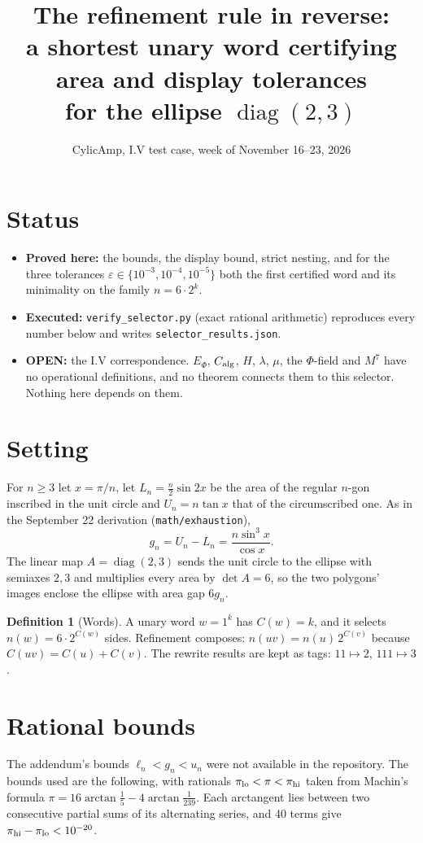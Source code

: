 \documentclass[11pt]{article}
\title{The refinement rule in reverse:\\ a shortest unary word certifying area and display tolerances\\ for the ellipse $\operatorname{diag}(2,3)$}
\author{CylicAmp, I.V test case, week of November 16--23, 2026}
\date{}
\theoremstyle{definition}
\newtheorem{definition}{Definition}
\theoremstyle{remark}
\begin{document}
\maketitle

\section*{Status}
\begin{itemize}
\item \textbf{Proved here:} the bounds, the display bound, strict nesting, and for the three tolerances
$\varepsilon\in\{10^{-3},10^{-4},10^{-5}\}$ both the first certified word and its minimality on the family
$n=6\cdot2^k$.
\item \textbf{Executed:} \texttt{verify\_selector.py} (exact rational arithmetic) reproduces every number below and writes
\texttt{selector\_results.json}.
\item \textbf{OPEN:} the I.V correspondence. $E_\Phi$, $C_{\rm alg}$, $H$, $\lambda$, $\mu$, the $\Phi$-field and $M^7$
have no operational definitions, and no theorem connects them to this selector. Nothing here depends on them.
\end{itemize}

\section{Setting}
For $n\ge 3$ let $x=\pi/n$, let $L_n=\tfrac n2\sin 2x$ be the area of the regular $n$-gon inscribed in the unit circle
and $U_n=n\tan x$ that of the circumscribed one. As in the September 22 derivation (\texttt{math/exhaustion}),
\[
g_n=U_n-L_n=\frac{n\sin^3x}{\cos x}.
\]
The linear map $A=\operatorname{diag}(2,3)$ sends the unit circle to the ellipse with semiaxes $2,3$ and multiplies every
area by $\det A=6$, so the two polygons' images enclose the ellipse with area gap $6g_n$.

\begin{definition}[Words]
A unary word $w=1^k$ has $C(w)=k$, and it selects $n(w)=6\cdot 2^{C(w)}$ sides. Refinement composes:
$n(uv)=n(u)\,2^{C(v)}$ because $C(uv)=C(u)+C(v)$. The rewrite results are kept as tags: $11\mapsto 2$, $111\mapsto 3$.
\end{definition}

\section{Rational bounds}
The addendum's bounds $\ell_n<g_n<u_n$ were not available in the repository. The bounds used are the following, with
rationals $\pi_{\rm lo}<\pi<\pi_{\rm hi}$ taken from Machin's formula
$\pi=16\arctan\frac15-4\arctan\frac1{239}$. Each arctangent lies between two consecutive partial sums of its
alternating series, and 40 terms give $\pi_{\rm hi}-\pi_{\rm lo}<10^{-20}$.
\end{document}

